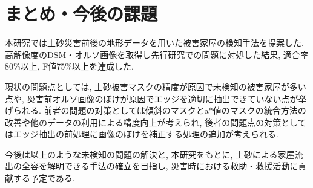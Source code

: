 \documentclass[a4paper, twocolumn, xelatex, 10pt, ja=standard, Ligatures=TeX]{bxjsarticle}
\begin{document}
	\section{まとめ・今後の課題}
		本研究では土砂災害前後の地形データを用いた被害家屋の検知手法を提案した. 
		高解像度のDSM・オルソ画像を取得し先行研究での問題に対処した結果, 適合率80\%以上, F値75\%以上を達成した. 

		現状の問題点としては, 土砂被害マスクの精度が原因で未検知の被害家屋が多い点や, 災害前オルソ画像のぼけが原因でエッジを適切に抽出できていない点が挙げられる. 
		前者の問題の対策としては傾斜のマスクとa*値のマスクの統合方法の改善や他のデータの利用による精度向上が考えられ, 
		後者の問題点の対策としてはエッジ抽出の前処理に画像のぼけを補正する処理の追加が考えられる. 
		
		今後は以上のような未検知の問題の解決と, 本研究をもとに, 土砂による家屋流出の全容を解明できる手法の確立を目指し, 
		災害時における救助・救援活動に貢献する予定である.  





		

\end{document}
